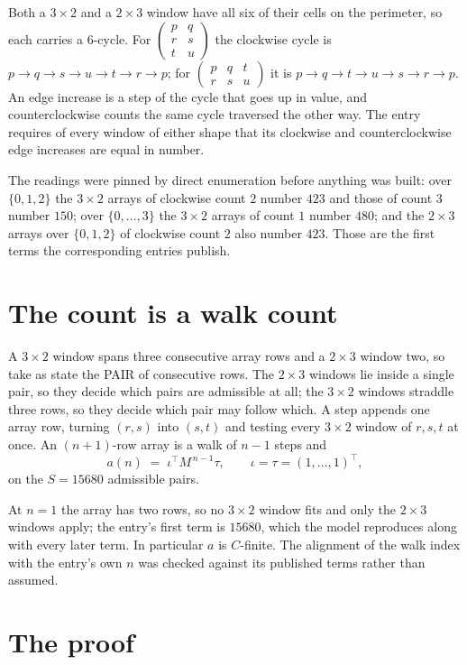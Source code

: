 \documentclass[11pt,a4paper]{article}
\theoremstyle{plain}
\theoremstyle{definition}
\begin{document}
Both a $3\times2$ and a $2\times3$ window have all six of their cells on the
perimeter, so each carries a $6$-cycle. For
$\begin{pmatrix}p&q\\r&s\\t&u\end{pmatrix}$ the clockwise cycle is
$p\to q\to s\to u\to t\to r\to p$; for
$\begin{pmatrix}p&q&t\\r&s&u\end{pmatrix}$ it is
$p\to q\to t\to u\to s\to r\to p$. An edge increase is a step of the cycle that goes up in
value, and counterclockwise counts the same cycle traversed the other way. The entry requires
of every window of either shape that its clockwise and counterclockwise edge increases are equal in number.

The readings were pinned by direct enumeration before anything was built: over
$\{0,1,2\}$ the $3\times2$ arrays of clockwise count $2$ number $423$ and those of count
$3$ number $150$; over $\{0,\dots,3\}$ the $3\times2$ arrays of count $1$ number $480$;
and the $2\times3$ arrays over $\{0,1,2\}$ of clockwise count $2$ also number $423$. Those
are the first terms the corresponding entries publish.

\section{The count is a walk count}

A $3\times2$ window spans three consecutive array rows and a $2\times3$
window two, so take as state the PAIR of consecutive rows. The $2\times3$ windows lie inside a
single pair, so they decide which pairs are admissible at all; the $3\times2$ windows straddle
three rows, so they decide which pair may follow which. A step appends one array row, turning
$(r,s)$ into $(s,t)$ and testing every $3\times2$ window of $r,s,t$ at once. An $(n+1)$-row
array is a walk of $n-1$ steps and
\[
a(n)\;=\;\iota^{\!\top}M^{\,n-1}\tau,\qquad\iota=\tau=(1,\dots,1)^{\!\top},
\]
on the $S=15680$ admissible pairs.

At $n=1$ the array has two rows, so no $3\times2$ window fits and only the
$2\times3$ windows apply; the entry's first term is
$15680$, which the model reproduces along with every later term.
In particular $a$ is $C$-finite. The alignment of the walk index with the entry's own $n$ was
checked against its published terms rather than assumed.

\section{The proof}
\end{document}
